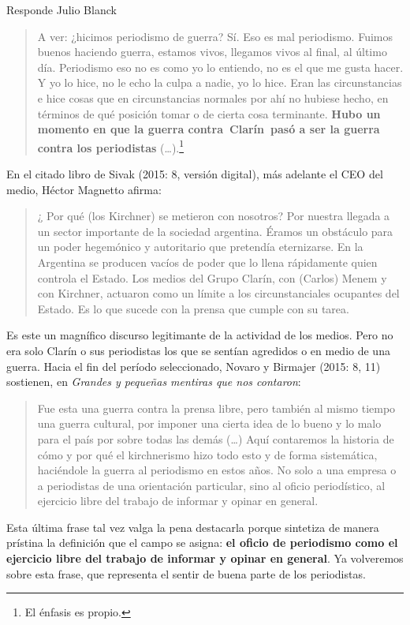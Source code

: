 Responde Julio Blanck

\begin{quote}
A ver: ¿hicimos periodismo de guerra? Sí. Eso es mal periodismo. Fuimos buenos haciendo guerra, estamos vivos, llegamos vivos al final, al último día. Periodismo eso no es como yo lo entiendo, no es el que me gusta hacer. Y yo lo hice, no le echo la culpa a nadie, yo lo hice. Eran las circunstancias e hice cosas que en circunstancias normales por ahí no hubiese hecho, en términos de qué posición tomar o de cierta cosa terminante. \textbf{Hubo un momento en que la guerra contra~Clarín~pasó a ser la guerra contra los periodistas} (\ldots).\footnote{El énfasis es propio.}
\end{quote}

En el citado libro de Sivak (2015: 8, versión digital), más adelante el CEO del medio, Héctor Magnetto afirma:

\begin{quote}
¿ Por qué (los Kirchner) se metieron con nosotros? Por nuestra llegada a un sector importante de la sociedad argentina. Éramos un obstáculo para un poder hegemónico y autoritario que pretendía eternizarse. En la Argentina se producen vacíos de poder que lo llena rápidamente quien controla el Estado. Los medios del Grupo Clarín, con (Carlos) Menem y con Kirchner, actuaron como un límite a los circunstanciales ocupantes del Estado. Es lo que sucede con la prensa que cumple con su tarea.
\end{quote}

Es este un magnífico discurso legitimante de la actividad de los medios. Pero no era solo Clarín o sus periodistas los que se sentían agredidos o en medio de una guerra. Hacia el fin del período seleccionado, Novaro y Birmajer (2015: 8, 11) sostienen, en \emph{Grandes y pequeñas mentiras que nos contaron}:

\begin{quote}
Fue esta una guerra contra la prensa libre, pero también al mismo tiempo una guerra cultural, por imponer una cierta idea de lo bueno y lo malo para el país por sobre todas las demás (\ldots) Aquí contaremos la historia de cómo y por qué el kirchnerismo hizo todo esto y de forma sistemática, haciéndole la guerra al periodismo en estos años. No solo a una empresa o a periodistas de una orientación particular, sino al oficio periodístico, al ejercicio libre del trabajo de informar y opinar en general.
\end{quote}

Esta última frase tal vez valga la pena destacarla porque sintetiza de manera prístina la definición que el campo se asigna: \textbf{el oficio de periodismo como el ejercicio libre del trabajo de informar y opinar en general}. Ya volveremos sobre esta frase, que representa el sentir de buena parte de los periodistas.

